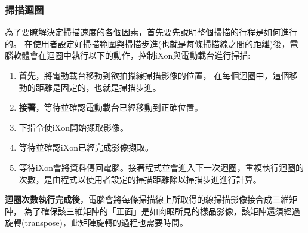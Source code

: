 \documentclass[12pt]{article}
\begin{document}
\subsubsection{掃描迴圈}\label{sec: scan loop}
為了要瞭解決定掃描速度的各個因素，首先要先說明整個掃描的行程是如何進行的。
在使用者設定好掃描範圍與掃描步進(也就是每條掃描線之間的距離)後，電腦軟體會在迴圈中執行以下的動作，控制iXon與電動載台進行掃描:
\begin{enumerate}
    \item \textbf{首先}，將電動載台移動到欲拍攝線掃描影像的位置，
    在每個迴圈中，這個移動的距離是固定的，也就是掃描步進。
    \item \textbf{接著}，等待並確認電動載台已經移動到正確位置。
    \item 下指令使iXon開始擷取影像。
    \item 等待並確認iXon已經完成影像擷取。
    \item 等待iXon會將資料傳回電腦。接著程式並會進入下一次迴圈，重複執行迴圈的次數，是由程式以使用者設定的掃描距離除以掃描步進進行計算。
\end{enumerate}

\textbf{迴圈次數執行完成後}，電腦會將每條掃描線上所取得的線掃描影像接合成三維矩陣，
為了確保該三維矩陣的「正面」是如肉眼所見的樣品影像，該矩陣還須經過旋轉(transpose)，此矩陣旋轉的過程也需要時間。
\end{document}
